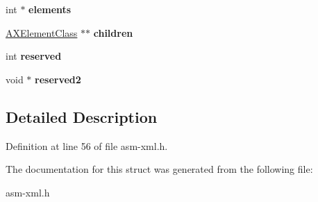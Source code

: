 \begin{DoxyCompactItemize}
\item 
\hypertarget{structAXElementClass_a33bf137217b84e981004cc8654751424}{int $\ast$ {\bfseries elements}}\label{structAXElementClass_a33bf137217b84e981004cc8654751424}

\item 
\hypertarget{structAXElementClass_aa218fc3411380a65d6420cb73fa65c07}{\hyperlink{structAXElementClass}{A\-X\-Element\-Class} $\ast$$\ast$ {\bfseries children}}\label{structAXElementClass_aa218fc3411380a65d6420cb73fa65c07}

\item 
\hypertarget{structAXElementClass_a79d17e6ab01c3f81d4ede6a4cf6954c1}{int {\bfseries reserved}}\label{structAXElementClass_a79d17e6ab01c3f81d4ede6a4cf6954c1}

\item 
\hypertarget{structAXElementClass_aa0c7a1405e94207734802a6e2951b56e}{void $\ast$ {\bfseries reserved2}}\label{structAXElementClass_aa0c7a1405e94207734802a6e2951b56e}

\end{DoxyCompactItemize}


\subsection{Detailed Description}


Definition at line 56 of file asm-\/xml.\-h.



The documentation for this struct was generated from the following file\-:\begin{DoxyCompactItemize}
\item 
asm-\/xml.\-h\end{DoxyCompactItemize}
